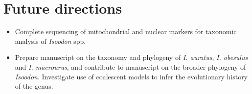 \documentclass[version=last, paper=a4, DIV=18, usenames, dvipsnames]{scrartcl}
\begin{document}
\section{Future directions}



\begin{itemize}

  \item Complete sequencing of mitochondrial and nuclear markers for taxonomic analysis of \emph{Isoodon} spp.

  \item Prepare manuscript on the taxonomy and phylogeny of \emph{I. auratus}, \emph{I. obesulus} and \emph{I. macrourus}, and contribute to manuscript on the broader phylogeny of \emph{Isoodon}. Investigate use of coalescent models to infer the evolutionary history of the genus.

\end{itemize}






\clearpage
\end{document}
